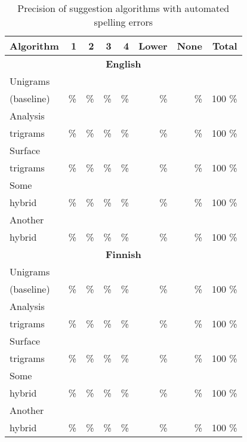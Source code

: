 \documentclass[11pt,a4paper]{article}
\begin{document}
\begin{table*}[h]
  \begin{center}
    \caption{Precision of suggestion algorithms with automated spelling errors
    \label{table:fake-eval}}
    \begin{scriptsize}
      \begin{tabular}{l|rrrr|r|r|r}
        \hline
        Algorithm & 1 & 2 & 3 & 4 & Lower & None & Total \\
        \hline
        \multicolumn{8}{c}{\textbf{English}} \\
        \hline
        Unigrams   &     &       &      &      &       &       &     \\
        (baseline) &  \% &    \% &   \% &   \% &    \% &    \% & 100 \% \\
        \hline
        Analysis &       &      &      &      &       &       &     \\
        trigrams &    \% &   \% &   \% &   \% &    \% &    \% & 100 \% \\
        \hline
        Surface  &       &      &      &      &       &       &     \\
        trigrams &    \% &   \% &   \% &   \% &    \% &    \% & 100 \% \\
        \hline
        Some     &       &      &      &      &       &       &     \\
        hybrid   &    \% &   \% &   \% &   \% &    \% &    \% & 100 \% \\
        \hline
        Another  &       &      &      &      &       &       &     \\
        hybrid   &    \% &   \% &   \% &   \% &    \% &    \% & 100 \% \\
        \hline
        \multicolumn{8}{c}{\textbf{Finnish}} \\
        \hline
        Unigrams   &     &       &      &      &       &       &     \\
        (baseline) &  \% &    \% &   \% &   \% &    \% &    \% & 100 \% \\
        \hline
        Analysis &       &      &      &      &       &       &     \\
        trigrams &    \% &   \% &   \% &   \% &    \% &    \% & 100 \% \\
        \hline
        Surface  &       &      &      &      &       &       &     \\
        trigrams &    \% &   \% &   \% &   \% &    \% &    \% & 100 \% \\
        \hline
        Some     &       &      &      &      &       &       &     \\
        hybrid   &    \% &   \% &   \% &   \% &    \% &    \% & 100 \% \\
        \hline
        Another  &       &      &      &      &       &       &     \\
        hybrid   &    \% &   \% &   \% &   \% &    \% &    \% & 100 \% \\
        \hline
      \end{tabular}
    \end{scriptsize}
  \end{center}
\end{table*}
\end{document}
